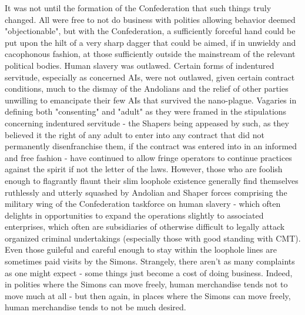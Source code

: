 It was not until the formation of the Confederation that such things
truly changed. All were free to not do business with polities allowing
behavior deemed "objectionable", but with the Confederation, a
sufficiently forceful hand could be put upon the hilt of a very sharp
dagger that could be aimed, if in unwieldy and cacophonous fashion, at
those sufficiently outside the mainstream of the relevant political
bodies. Human slavery was outlawed. Certain forms of indentured
servitude, especially as concerned AIs, were not outlawed, given
certain contract conditions, much to the dismay of the Andolians and
the relief of other parties unwilling to emancipate their few AIs that
survived the nano-plague. Vagaries in defining both "consenting" and
"adult" as they were framed in the stipulations concerning indentured
servitude - the Shapers being appeased by such, as they believed it
the right of any adult to enter into any contract that did not
permanently disenfranchise them, if the contract was entered into in
an informed and free fashion - have continued to allow fringe
operators to continue practices against the spirit if not the letter
of the laws. However, those who are foolish enough to flagrantly
flaunt their slim loophole existence generally find themselves
ruthlessly and utterly squashed by Andolian and Shaper forces
comprising the military wing of the Confederation taskforce on human
slavery - which often delights in opportunities to expand the
operations slightly to associated enterprises, which often are
subsidiaries of otherwise difficult to legally attack organized
criminal undertakings (especially those with good standing with
CMT). Even those guileful and careful enough to stay within the
loophole lines are sometimes paid visits by the Simons. Strangely,
there aren't as many complaints as one might expect - some things just
become a cost of doing business. Indeed, in polities where the Simons
can move freely, human merchandise tends not to move much at all - but
then again, in places where the Simons can move freely, human
merchandise tends to not be much desired.

